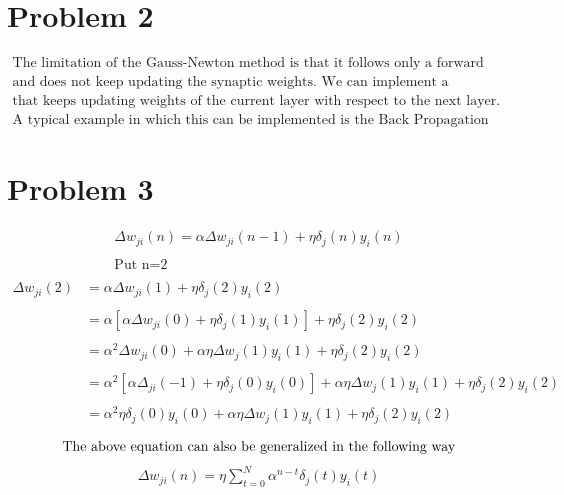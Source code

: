 \documentclass[12pt]{article}
\begin{document}
\section*{Problem 2}

\begin{gather*}
  \text{The limitation of the Gauss-Newton method is that it follows only a forward pass approach}\\
  \text{and does not keep updating the synaptic weights. We can implement a backward pass system}\\
  \text{that keeps updating weights of the current layer with respect to the next layer.}\\
  \text{A typical example in which this can be implemented is the Back Propagation Algorithm.}
\end{gather*}

\section*{Problem 3}
\begin{gather*}
    \Delta w_{ji}(n) = \alpha \Delta w_{ji}(n-1) + \eta\delta_j(n)y_i(n)\\\\
    \text{Put n=2}\\
\end{gather*}
\begin{align*}
    \Delta w_{ji}(2) &= \alpha \Delta w_{ji}(1) + \eta\delta_j(2)y_i(2)\\\\
    &=\alpha[\alpha\Delta w_{ji}(0)+\eta\delta_j(1)y_i(1)]+ \eta\delta_j(2)y_i(2)\\\\
    &=\alpha^2\Delta w_{ji}(0)+\alpha\eta\Delta w_j(1)y_i(1)+ \eta\delta_j(2)y_i(2)\\ \\
    &=\alpha^2[\alpha\Delta_{ji}(-1)+\eta\delta_j(0)y_i(0)]+\alpha\eta\Delta w_j(1)y_i(1)+ \eta\delta_j(2)y_i(2)\\ \\
    &=\alpha^2\eta\delta_j(0)y_i(0) +\alpha\eta\Delta w_j(1)y_i(1)+ \eta\delta_j(2)y_i(2)\\ 
\end{align*}
\[  
    \text{The above equation can also be generalized in the following way}\\
\]
\begin{gather*}
    \Delta w_{ji}(n) = \eta\sum_{t=0}^{N}\alpha^{n-t}\delta_j(t)y_i(t)
\end{gather*}
\end{document}

